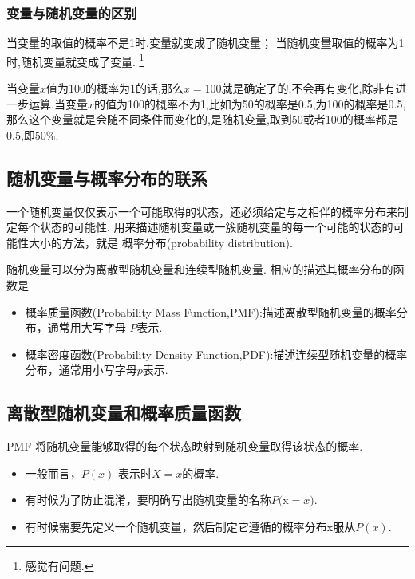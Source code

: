 \subsubsection{变量与随机变量的区别}
\label{sec:4.2.2}
​当变量的取值的概率不是1时,变量就变成了随机变量；
当随机变量取值的概率为1时,随机变量就变成了变量.
\footnote{感觉有问题.}

\begin{example}
当变量\(x\)值为100的概率为1的话,那么\(x=100\)就是确定了的,不会再有变化,除非有进一步运算.
​当变量\(x\)的值为100的概率不为1,比如为50的概率是0.5,为100的概率是0.5,那么这个变量就是会随不同条件而变化的,是随机变量,取到50或者100的概率都是0.5,即$50\%$.
\end{example}
\subsection{随机变量与概率分布的联系}
\label{ux968fux673aux53d8ux91cfux4e0eux6982ux7387ux5206ux5e03ux7684ux8054ux7cfb}

\begin{defination}
一个随机变量仅仅表示一个可能取得的状态，还必须给定与之相伴的概率分布来制定每个状态的可能性.
用来描述随机变量或一簇随机变量的每一个可能的状态的可能性大小的方法，就是 {概率分布(probability distribution)}.  
\end{defination}

随机变量可以分为离散型随机变量和连续型随机变量.
相应的描述其概率分布的函数是
\begin{itemize}
\item 概率质量函数(Probability Mass Function,PMF):描述离散型随机变量的概率分布，通常用大写字母 \(P\)表示.
\item 概率密度函数(Probability Density Function,PDF):描述连续型随机变量的概率分布，通常用小写字母\(p\)表示.
\end{itemize}

\subsection{离散型随机变量和概率质量函数}
\label{ux79bbux6563ux578bux968fux673aux53d8ux91cfux548cux6982ux7387ux8d28ux91cfux51fdux6570}
\begin{defination}{PMF}
  将随机变量能够取得的每个状态映射到随机变量取得该状态的概率.
\end{defination}
\begin{itemize}
\item  一般而言，\(P(x)​\) 表示时\(X=x​\)的概率.
\item  有时候为了防止混淆，要明确写出随机变量的名称\(P(​\)x\(=x)​\).
\item  有时候需要先定义一个随机变量，然后制定它遵循的概率分布x服从\(P(​x​)​\).
\end{itemize}

